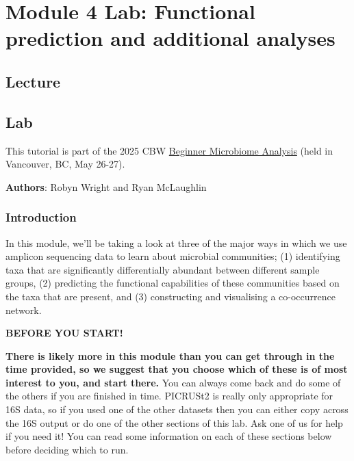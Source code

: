 \documentclass[
]{book}
\newenvironment{redbox}{
  \definecolor{shadecolor}{RGB}{243, 154, 157}
  \color{white}
  \begin{shaded}}
 {\end{shaded}}
\begin{document}
\chapter{Module 4 Lab: Functional prediction and additional analyses}\label{module-4-lab-functional-prediction-and-additional-analyses}

\section{Lecture}\label{lecture-3}

\section{Lab}\label{lab-1}

This tutorial is part of the 2025 CBW \href{https://bioinformaticsdotca.github.io/BMB_2025/}{Beginner Microbiome Analysis} (held in Vancouver, BC, May 26-27).

\textbf{Authors}: Robyn Wright and Ryan McLaughlin

\subsection{Introduction}\label{introduction-3}

In this module, we'll be taking a look at three of the major ways in which we use amplicon sequencing data to learn about microbial communities; (1) identifying taxa that are significantly differentially abundant between different sample groups, (2) predicting the functional capabilities of these communities based on the taxa that are present, and (3) constructing and visualising a co-occurrence network.

\begin{redbox}

\begin{center}
\textbf{BEFORE YOU START!}

\end{center}

\textbf{There is likely more in this module than you can get through in the time provided, so we suggest that you choose which of these is of most interest to you, and start there.} You can always come back and do some of the others if you are finished in time. PICRUSt2 is really only appropriate for 16S data, so if you used one of the other datasets then you can either copy across the 16S output or do one of the other sections of this lab. Ask one of us for help if you need it! You can read some information on each of these sections below before deciding which to run.

\end{redbox}
\end{document}
